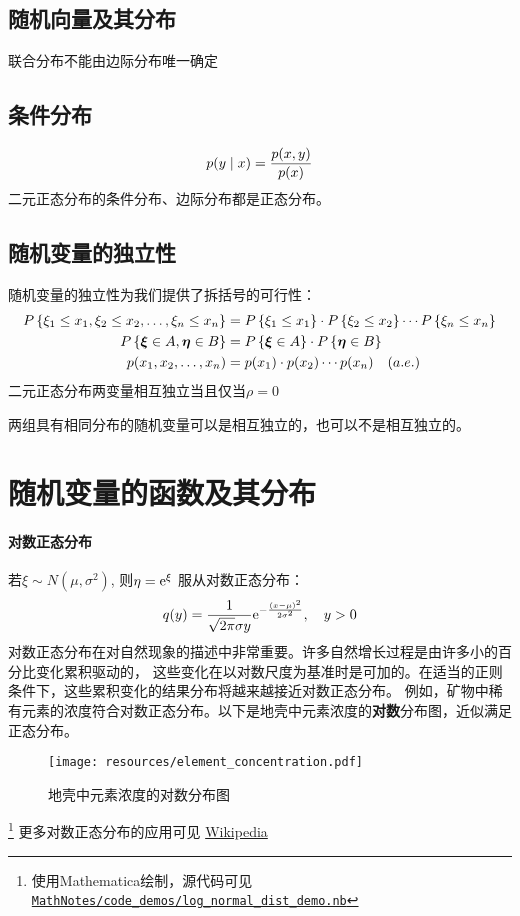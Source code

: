 \subsection{随机向量及其分布}
联合分布不能由边际分布唯一确定
\subsection{条件分布}
\[
    p(y\mid x)=\frac{p(x,y)}{p(x)} \\
\]
二元正态分布的条件分布、边际分布都是正态分布。
\subsection{随机变量的独立性}
随机变量的独立性为我们提供了拆括号的可行性：
\begin{align*}
    P\left\{\xi_{1} \leq x_{1}, \xi_{2} \leq x_{2}, \dots ,
    \xi_{n} \leq x_{n}\right\} &=
    P\left\{\xi_{1} \leq x_{1}\right\} \cdot
    P\left\{\xi_{2} \leq x_{2}\right\} \cdots
    P\left\{\xi_{n} \leq x_{n}\right\}\\
    P\left\{\bm{\xi} \in A, \bm{\eta} \in B\right\} &=
    P\left\{\bm{\xi} \in A\right\} \cdot
    P\left\{\bm{\eta} \in B\right\} \\
    p(x_{1},x_{2},\ldots,x_{n}) &= p(x_{1}) \cdot p(x_{2})
    \cdots p(x_{n}) \quad (a. e.)
\end{align*}
二元正态分布两变量相互独立当且仅当\(\rho=0\)

两组具有相同分布的随机变量可以是相互独立的，也可以不是相互独立的。

\section{随机变量的函数及其分布}

\paragraph{对数正态分布}
若\(\xi\sim N(\mu,\sigma^{2})\), 则\(\eta=\mathrm{e}^{\xi} \) 服从对数正态分布：
\[
    q(y) = \frac{1}{\sqrt{2\pi}\sigma y}
    \mathrm{e}^{-\frac{(x-\mu)^{2}}{2\sigma^{2}}},\quad y>0
\]
对数正态分布在对自然现象的描述中非常重要。许多自然增长过程是由许多小的百分比变化累积驱动的，
这些变化在以对数尺度为基准时是可加的。在适当的正则条件下，这些累积变化的结果分布将越来越接近对数正态分布。
例如，矿物中稀有元素的浓度符合对数正态分布。以下是地壳中元素浓度的\textbf{对数}分布图，近似满足正态分布。
\begin{figure}[H]
    \centering
    \texttt{[image: resources/element\_concentration.pdf]}
    \caption{地壳中元素浓度的对数分布图}
    \label{fig:lognormal}
\end{figure}\footnote{使用Mathematica绘制，源代码可见
\href{https://github.com/Sazzzzzz/MathNotes/blob/main/code_demos/log_normal_dist_demo.nb}{\texttt{MathNotes/code_demos/log_normal_dist_demo.nb}}}
更多对数正态分布的应用可见
\href{https://en.wikipedia.org/wiki/Log-normal_distribution#Occurrence_and_applications}{Wikipedia}

